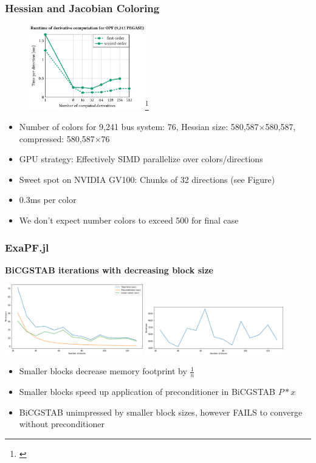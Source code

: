 \begin{frame}
  \frametitle{Hessian and Jacobian Coloring}
  \begin{center}
    \begin{figure}
      \includegraphics[width=0.45\textwidth]{figures/directionsgpu}\footnote{\cite{simdicpp}}
    \end{figure}
  \end{center}
  \begin{itemize}
    \item Number of colors for 9,241 bus system: 76, Hessian size: 580,587$\times$580,587, compressed: 580,587$\times$76
    \item GPU strategy: Effectively SIMD parallelize over colors/directions
    \item Sweet spot on NVIDIA GV100: Chunks of 32 directions (see Figure)
    \item 0.3ms per color
    \item We don’t expect number colors to exceed 500 for final case
  \end{itemize}
\end{frame}

\begin{frame}[fragile]
  \frametitle{ExaPF.jl}
  {\bf BiCGSTAB iterations with decreasing block size}
  \begin{center}
   \includegraphics[width=0.45\textwidth]{figures/blocks}
   \includegraphics[width=0.45\textwidth]{figures/bicgstabiter}
  \end{center}
  \begin{itemize}
    \item Smaller blocks decrease memory footprint by $\frac{1}{n}$ 
    \item Smaller blocks speed up application of preconditioner in BiCGSTAB $P * x$
    \item BiCGSTAB unimpressed by smaller block sizes, however FAILS to converge without preconditioner
  \end{itemize}
\end{frame}

